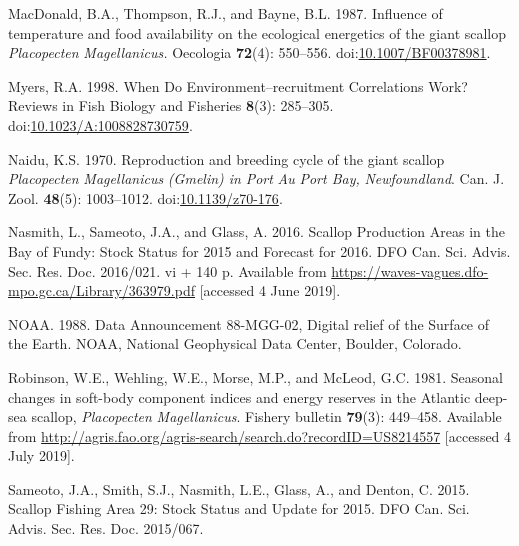 \documentclass[
]{article}
\newlength{\cslhangindent}
\newlength{\cslentryspacingunit} %
\newenvironment{CSLReferences}[2] %
 {%
  \setlength{\parindent}{0pt}
  \ifodd #1
  \let\oldpar\par
  \def\par{\hangindent=\cslhangindent\oldpar}
  \fi
  \setlength{\parskip}{#2\cslentryspacingunit}
 }%
 {}
\begin{document}
\begin{CSLReferences}{1}{0}
\leavevmode{}%
MacDonald, B.A., Thompson, R.J., and Bayne, B.L. 1987. Influence of temperature and food availability on the ecological energetics of the giant scallop {\emph{Placopecten}}{ \emph{Magellanicus}}{\emph{\emph{.}}} Oecologia \textbf{72}(4): 550--556. doi:\href{https://doi.org/10.1007/BF00378981}{10.1007/BF00378981}.

\leavevmode{}%
Myers, R.A. 1998. When {Do Environment}--recruitment {Correlations Work}? Reviews in Fish Biology and Fisheries \textbf{8}(3): 285--305. doi:\href{https://doi.org/10.1023/A:1008828730759}{10.1023/A:1008828730759}.

\leavevmode{}%
Naidu, K.S. 1970. Reproduction and breeding cycle of the giant scallop {\emph{Placopecten}}{ \emph{Magellanicus}}{ \emph{\emph{(}}}{\emph{\emph{Gmelin}}}{\emph{\emph{) in}} }{\emph{\emph{Port}}}{ \emph{\emph{Au}} }{\emph{\emph{Port Bay}}}{\emph{\emph{,}} }{\emph{\emph{Newfoundland}}}. Can. J. Zool. \textbf{48}(5): 1003--1012. doi:\href{https://doi.org/10.1139/z70-176}{10.1139/z70-176}.

\leavevmode{}%
Nasmith, L., Sameoto, J.A., and Glass, A. 2016. Scallop {Production Areas} in the {Bay} of {Fundy}: {Stock Status} for 2015 and {Forecast} for 2016. {DFO Can. Sci. Advis. Sec. Res. Doc. 2016/021. vi + 140 p.} Available from \url{https://waves-vagues.dfo-mpo.gc.ca/Library/363979.pdf} {[}accessed 4 June 2019{]}.

\leavevmode{}%
NOAA. 1988. Data {Announcement} 88-{MGG-02}, {Digital} relief of the {Surface} of the {Earth}. {NOAA, National Geophysical Data Center}, {Boulder, Colorado}.

\leavevmode{}%
Robinson, W.E., Wehling, W.E., Morse, M.P., and McLeod, G.C. 1981. Seasonal changes in soft-body component indices and energy reserves in the {Atlantic} deep-sea scallop, {\emph{Placopecten}}{ \emph{Magellanicus}}{\emph{\emph{}}}. Fishery bulletin \textbf{79}(3): 449--458. Available from \url{http://agris.fao.org/agris-search/search.do?recordID=US8214557} {[}accessed 4 July 2019{]}.

\leavevmode{}%
Sameoto, J.A., Smith, S.J., Nasmith, L.E., Glass, A., and Denton, C. 2015. Scallop {Fishing Area} 29: {Stock Status} and {Update} for 2015. DFO Can. Sci. Advis. Sec. Res. Doc. 2015/067.


\end{CSLReferences}
\end{document}
